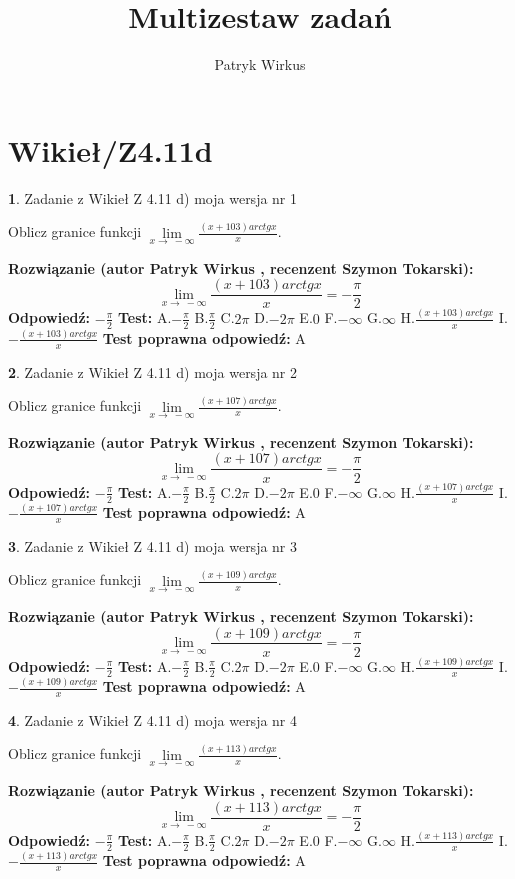 \documentclass[12pt, a4paper]{article}
\title{Multizestaw zadań}
\author{Patryk Wirkus}
\date{}
\theoremstyle{definition} %
\newtheorem{zad}{}
\newcommand{\kategoria}[1]{\section{#1}}
\newcommand{\zadStart}[1]{\begin{zad}#1\newline}
\newcommand{\zadStop}{\end{zad}}
\newcommand{\rozwStart}[2]{\noindent \textbf{Rozwiązanie (autor #1 , recenzent #2): }\newline}
\newcommand{\rozwStop}{\newline}
\newcommand{\odpStart}{\noindent \textbf{Odpowiedź:}\newline}
\newcommand{\odpStop}{\newline}
\newcommand{\testStart}{\noindent \textbf{Test:}\newline}
\newcommand{\testStop}{\newline}
\newcommand{\kluczStart}{\noindent \textbf{Test poprawna odpowiedź:}\newline}
\newcommand{\kluczStop}{\newline}
\begin{document}
\maketitle

\kategoria{Wikieł/Z4.11d}


\zadStart{Zadanie z Wikieł Z 4.11 d) moja wersja nr 1}

Oblicz granice funkcji $\lim\limits_{x\to\ -\infty}\frac{(x+103)arctgx}{x}$.
\zadStop
\rozwStart{Patryk Wirkus}{Szymon Tokarski}
$$\lim\limits_{x\to\ -\infty}\frac{(x+103)arctgx}{x} = -\frac{\pi}{2}$$
\rozwStop
\odpStart
$-\frac{\pi}{2}$
\odpStop
\testStart
A.$-\frac{\pi}{2}$ B.$\frac{\pi}{2}$ C.$2\pi$ D.$-2\pi$ E.$0$ F.$-\infty$ G.$\infty$ H.$\frac{(x+103)arctgx}{x}$ I.$-\frac{(x+103)arctgx}{x}$
\testStop
\kluczStart
A
\kluczStop



\zadStart{Zadanie z Wikieł Z 4.11 d) moja wersja nr 2}

Oblicz granice funkcji $\lim\limits_{x\to\ -\infty}\frac{(x+107)arctgx}{x}$.
\zadStop
\rozwStart{Patryk Wirkus}{Szymon Tokarski}
$$\lim\limits_{x\to\ -\infty}\frac{(x+107)arctgx}{x} = -\frac{\pi}{2}$$
\rozwStop
\odpStart
$-\frac{\pi}{2}$
\odpStop
\testStart
A.$-\frac{\pi}{2}$ B.$\frac{\pi}{2}$ C.$2\pi$ D.$-2\pi$ E.$0$ F.$-\infty$ G.$\infty$ H.$\frac{(x+107)arctgx}{x}$ I.$-\frac{(x+107)arctgx}{x}$
\testStop
\kluczStart
A
\kluczStop



\zadStart{Zadanie z Wikieł Z 4.11 d) moja wersja nr 3}

Oblicz granice funkcji $\lim\limits_{x\to\ -\infty}\frac{(x+109)arctgx}{x}$.
\zadStop
\rozwStart{Patryk Wirkus}{Szymon Tokarski}
$$\lim\limits_{x\to\ -\infty}\frac{(x+109)arctgx}{x} = -\frac{\pi}{2}$$
\rozwStop
\odpStart
$-\frac{\pi}{2}$
\odpStop
\testStart
A.$-\frac{\pi}{2}$ B.$\frac{\pi}{2}$ C.$2\pi$ D.$-2\pi$ E.$0$ F.$-\infty$ G.$\infty$ H.$\frac{(x+109)arctgx}{x}$ I.$-\frac{(x+109)arctgx}{x}$
\testStop
\kluczStart
A
\kluczStop



\zadStart{Zadanie z Wikieł Z 4.11 d) moja wersja nr 4}

Oblicz granice funkcji $\lim\limits_{x\to\ -\infty}\frac{(x+113)arctgx}{x}$.
\zadStop
\rozwStart{Patryk Wirkus}{Szymon Tokarski}
$$\lim\limits_{x\to\ -\infty}\frac{(x+113)arctgx}{x} = -\frac{\pi}{2}$$
\rozwStop
\odpStart
$-\frac{\pi}{2}$
\odpStop
\testStart
A.$-\frac{\pi}{2}$ B.$\frac{\pi}{2}$ C.$2\pi$ D.$-2\pi$ E.$0$ F.$-\infty$ G.$\infty$ H.$\frac{(x+113)arctgx}{x}$ I.$-\frac{(x+113)arctgx}{x}$
\testStop
\kluczStart
A
\kluczStop
\end{document}
